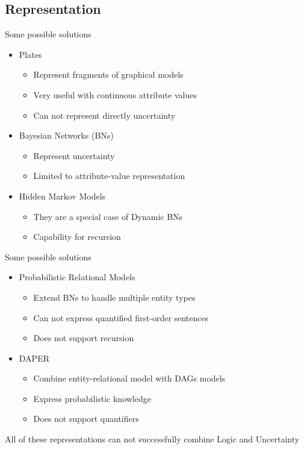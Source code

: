 \subsection{Representation}

\begin{frame}
	\pause
	\begin{block}{Some possible solutions}
		\begin{itemize}
			\item Plates
			\begin{itemize}
				\item Represent fragments of graphical models
				\item Very useful with continuous attribute values
				\item Can not represent directly uncertainty
			\end{itemize}
			\pause
			\item Bayesian Networks (BNs)
			\begin{itemize}
				\item Represent uncertainty
				\item Limited to attribute-value representation
			\end{itemize}
			\pause
			\item Hidden Markov Models
			\begin{itemize}
				\item They are a special case of Dynamic BNs
				\item Capability for recursion
			\end{itemize}
		\end{itemize}
	\end{block}
\end{frame}

\begin{frame}
	\begin{block}{Some possible solutions}
		\begin{itemize}
			\item Probabilistic Relational Models
			\begin{itemize}
				\item Extend BNs to handle multiple entity types
				\item Can not express quantified first-order sentences
				\item Does not support recursion
			\end{itemize}
			\pause
			\item DAPER
			\begin{itemize}
				\item Combine entity-relational model with DAGs models
				\item Express probabilistic knowledge
				\item Does not support quantifiers
			\end{itemize}
		\end{itemize}
	\end{block}
	All of these representations can not successfully combine \alert{Logic} and \alert{Uncertainty}
\end{frame}